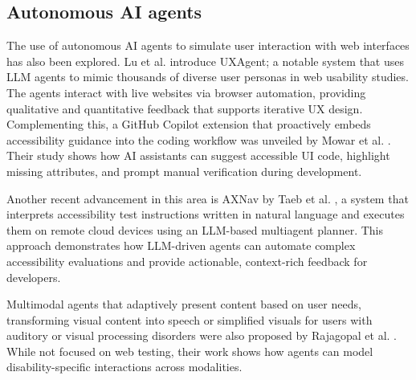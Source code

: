 \subsection{Autonomous AI agents}

The use of autonomous \ac{AI} agents to simulate user interaction with web interfaces has also been explored. Lu et al. \cite{lu2025uxagent} introduce UXAgent; a notable system that uses LLM agents to mimic thousands of diverse user personas in web usability studies. The agents interact with live websites via browser automation, providing qualitative and quantitative feedback that supports iterative UX design. 
Complementing this, a GitHub Copilot extension that proactively embeds accessibility guidance into the coding workflow was unveiled by Mowar et al. \cite{mowar2025codea11y}. Their study shows how \ac{AI} assistants can suggest accessible \ac{UI} code, highlight missing attributes, and prompt manual verification during development.

Another recent advancement in this area is AXNav by Taeb et al. \cite{taeb2024axnav}, a system that interprets accessibility test instructions written in natural language and executes them on remote cloud devices using an LLM-based multiagent planner. This approach demonstrates how LLM-driven agents can automate complex accessibility evaluations and provide actionable, context-rich feedback for developers.

Multimodal agents that adaptively present content based on user needs, transforming visual content into speech or simplified visuals for users with auditory or visual processing disorders were also proposed by Rajagopal et al. \cite{rajagopal2023design}. While not focused on web testing, their work shows how agents can model disability-specific interactions across modalities.

